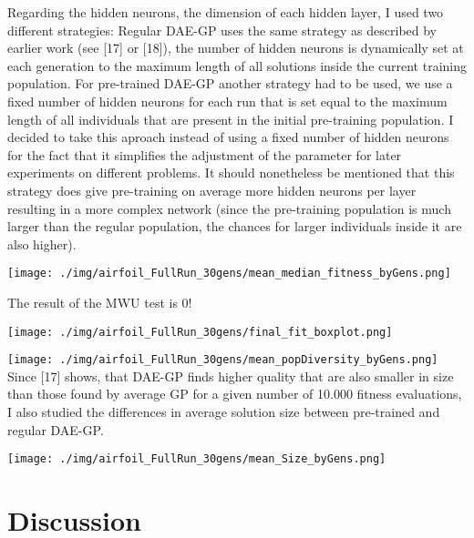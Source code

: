 \documentclass[
  11pt,
]{article}
\let\origfigure\figure
\let\endorigfigure\endfigure
\renewenvironment{figure}[1][2] {
    \expandafter\origfigure\expandafter[H]
} {
    \endorigfigure
}
\begin{document}
Regarding the hidden neurons, the dimension of each hidden layer, I used
two different strategies: Regular DAE-GP uses the same strategy as
described by earlier work (see {[}17{]} or {[}18{]}), the number of
hidden neurons is dynamically set at each generation to the maximum
length of all solutions inside the current training population. For
pre-trained DAE-GP another strategy had to be used, we use a fixed
number of hidden neurons for each run that is set equal to the maximum
length of all individuals that are present in the initial pre-training
population. I decided to take this aproach instead of using a fixed
number of hidden neurons for the fact that it simplifies the adjustment
of the parameter for later experiments on different problems. It should
nonetheless be mentioned that this strategy does give pre-training on
average more hidden neurons per layer resulting in a more complex
network (since the pre-training population is much larger than the
regular population, the chances for larger individuals inside it are
also higher).

\begin{figure}
\centering
\texttt{[image: ./img/airfoil\_FullRun\_30gens/mean\_median\_fitness\_byGens.png]}
\caption{Airfoil - Best Fitness over 30 Generations}
\end{figure}

The result of the MWU test is 0!

\begin{figure}
\centering
\texttt{[image: ./img/airfoil\_FullRun\_30gens/final\_fit\_boxplot.png]}
\caption{Airfoil - Fitness Distribution Boxplot}
\end{figure}

\texttt{[image: ./img/airfoil\_FullRun\_30gens/mean\_popDiversity\_byGens.png]}
Since {[}17{]} shows, that DAE-GP finds higher quality that are also
smaller in size than those found by average GP for a given number of
10.000 fitness evaluations, I also studied the differences in average
solution size between pre-trained and regular DAE-GP.

\begin{figure}
\centering
\texttt{[image: ./img/airfoil\_FullRun\_30gens/mean\_Size\_byGens.png]}
\caption{Airfoil - Average Solution Size}
\end{figure}

\hypertarget{discussion}{%
\section{Discussion}\label{discussion}}
\end{document}
